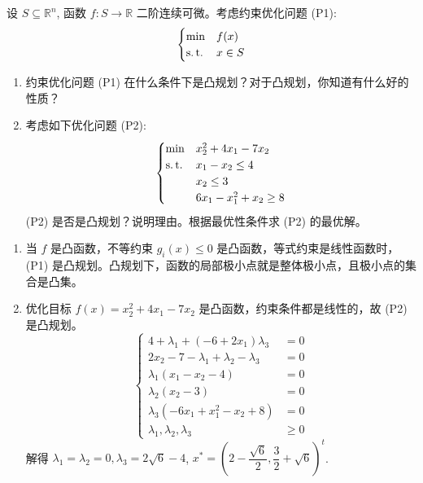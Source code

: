 \begin{Problem}
    设 $S \subseteq \mathbb{R}^n$, 函数 $f: S \to \mathbb{R}$ 二阶连续可微。考虑约束优化问题 (P1):
    \[\begin{cases}
        \min & f(x)\\
        \operatorname{s.t.} & x \in S
    \end{cases}\]
    \begin{enumerate}
        \item 约束优化问题 (P1) 在什么条件下是凸规划？对于凸规划，你知道有什么好的性质？
        \item 考虑如下优化问题 (P2):\[\begin{cases}
            \min & x_2^2 + 4x_1 - 7x_2\\
            \operatorname{s.t.} & x_1 - x_2 \le 4\\
            &x_2 \le 3\\
            &6x_1 - x_1^2 + x_2 \ge 8
        \end{cases}\]
        (P2) 是否是凸规划？说明理由。根据最优性条件求 (P2) 的最优解。
    \end{enumerate}

    \Answer \text{}\begin{enumerate}
        \item 当 $f$ 是凸函数，不等约束 $g_i(x) \le 0$ 是凸函数，等式约束是线性函数时，(P1) 是凸规划。凸规划下，函数的局部极小点就是整体极小点，且极小点的集合是凸集。
        \item 优化目标 $f(x) = x_2^2 + 4x_1 - 7x_2$ 是凸函数，约束条件都是线性的，故 (P2) 是凸规划。
        \[\begin{cases}
            4 + \lambda_1 + (-6 + 2x_1)\lambda_3 &= 0\\
            2x_2 - 7 - \lambda_1 + \lambda_2 - \lambda_3 &= 0\\
            \lambda_1(x_1 - x_2 - 4) &= 0\\
            \lambda_2(x_2 - 3) &= 0\\
            \lambda_3(-6x_1 + x_1^2 - x_2 + 8) &= 0\\
            \lambda_1, \lambda_2, \lambda_3 &\ge 0
        \end{cases}\]
        解得 $\lambda_1 = \lambda_2 = 0, \lambda_3 = 2\sqrt{6} - 4$, $x^* = \left(2 - \dfrac{\sqrt{6}}{2}, \dfrac{3}{2} + \sqrt{6}\right)^t$.
    \end{enumerate}
\end{Problem}

